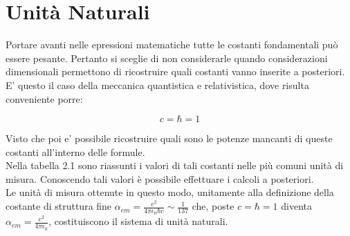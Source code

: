 \chapter{Unità Naturali}

Portare avanti nelle epressioni matematiche tutte le costanti fondamentali può essere pesante. Pertanto si sceglie di non considerarle quando considerazioni dimensionali permettono di ricostruire quali costanti vanno inserite a posteriori. E' questo il caso della meccanica quantistica e relativistica, dove risulta conveniente porre:

\begin{equation}
c=\hbar=1
\end{equation}

Visto che poi e' possibile ricostruire quali sono le potenze mancanti di queste costanti all'interno delle formule.\\

Nella tabella 2.1 sono riassunti i valori di tali costanti nelle più comuni unità di misura. Conoscendo tali valori è possibile effettuare i calcoli a posteriori.\\
Le unità di misura ottenute in questo modo, unitamente alla definizione della costante di struttura fine $\alpha_{em}=\frac{e^2}{4\pi\epsilon_0\hbar c}\sim\frac{1}{137}$ che, poste $c=\hbar=1$ diventa $\alpha_{em}=\frac{e^2}{4\pi\epsilon_0}$, costituiscono il sistema di unità naturali.

